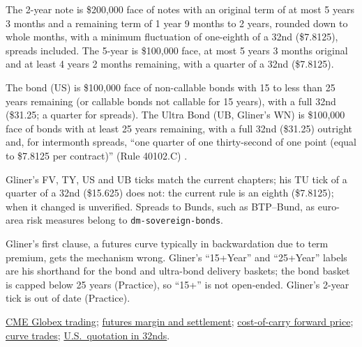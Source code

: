\begin{qfconvention}
The 2-year note is \$200,000 face of notes with an original term of at most 5 years 3 months and a remaining term of 1 year 9 months to 2 years, rounded down to whole months, with a minimum fluctuation of one-eighth of a 32nd (\$7.8125), spreads included. The 5-year is \$100,000 face, at most 5 years 3 months original and at least 4 years 2 months remaining, with a quarter of a 32nd (\$7.8125).

The bond (US) is \$100,000 face of non-callable bonds with 15 to less than 25 years remaining (or callable bonds not callable for 15 years), with a full 32nd (\$31.25; a quarter for spreads). The Ultra Bond (UB, Gliner's WN) is \$100,000 face of bonds with at least 25 years remaining, with a full 32nd (\$31.25) outright and, for intermonth spreads, ``one quarter of one thirty-second of one point (equal to \$7.8125 per contract)'' (Rule 40102.C) \citep[Rules 18101.A--18102.C, 19102.C, 20101.A--20102.C, 21101.A--21102.C and 40101.A--40102.C]{cbot-treasury-chapters-2026}.

Gliner's FV, TY, US and UB ticks match the current chapters; his TU tick of a quarter of a 32nd (\$15.625) does not: the current rule is an eighth (\$7.8125); when it changed is unverified. Spreads to Bunds, such as BTP--Bund, as euro-area risk measures belong to \nolinkurl{dm-sovereign-bonds}.

 Gliner's first clause, a futures curve typically in backwardation due to term premium, gets the mechanism wrong. Gliner's ``15+Year'' and ``25+Year'' labels are his shorthand for the bond and ultra-bond delivery baskets; the bond basket is capped below 25 years (Practice), so ``15+'' is not open-ended. Gliner's 2-year tick is out of date (Practice).

 \hyperref[conv:cme-globex-trading]{CME Globex trading}; \hyperref[mech:futures-margin-settlement]{futures margin and settlement}; \hyperref[res:cost-of-carry-forward-price]{cost-of-carry forward price}; \hyperref[meth:curve-trades-carry-rolldown]{curve trades}; \hyperref[conv:us-rate-quotation]{U.S.\ quotation in 32nds}.


\end{qfconvention}
